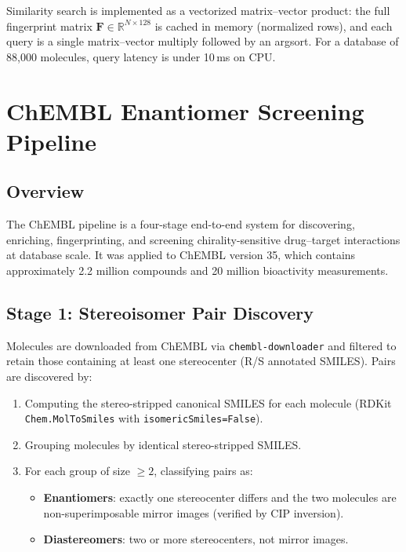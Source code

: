 \documentclass[11pt,a4paper]{article}
\begin{document}
Similarity search is implemented as a vectorized matrix--vector product:
the full fingerprint matrix $\mathbf{F} \in \mathbb{R}^{N \times 128}$ is
cached in memory (normalized rows), and each query is a single matrix--vector
multiply followed by an argsort. For a database of 88,000 molecules, query
latency is under 10\,ms on CPU.

\newpage

\section{ChEMBL Enantiomer Screening Pipeline}
\label{sec:chembl}

\subsection{Overview}

The ChEMBL pipeline is a four-stage end-to-end system for discovering, enriching,
fingerprinting, and screening chirality-sensitive drug--target interactions at
database scale. It was applied to ChEMBL version 35, which contains approximately
2.2 million compounds and 20 million bioactivity measurements.

\subsection{Stage 1: Stereoisomer Pair Discovery}

Molecules are downloaded from ChEMBL via \texttt{chembl-downloader} and filtered
to retain those containing at least one stereocenter (R/S annotated SMILES).
Pairs are discovered by:

\begin{enumerate}[leftmargin=1.5em]
  \item Computing the stereo-stripped canonical SMILES for each molecule (RDKit
    \texttt{Chem.MolToSmiles} with \texttt{isomericSmiles=False}).
  \item Grouping molecules by identical stereo-stripped SMILES.
  \item For each group of size $\ge 2$, classifying pairs as:
    \begin{itemize}[leftmargin=1.5em]
      \item \textbf{Enantiomers}: exactly one stereocenter differs and the two
        molecules are non-superimposable mirror images (verified by CIP inversion).
      \item \textbf{Diastereomers}: two or more stereocenters, not mirror images.
    \end{itemize}
\end{enumerate}
\end{document}
